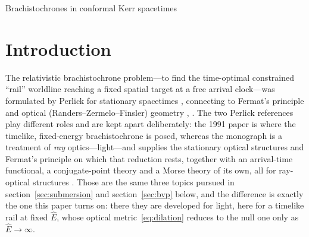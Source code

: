 \documentclass[12pt]{iopart}
\theoremstyle{plain}
\theoremstyle{definition}
\theoremstyle{remark}
\newcommand{\Ehat}{\hat E}
\begin{document}
\maketitle
%
         {Brachistochrones in conformal Kerr spacetimes}

\section{Introduction}
\label{sec:intro}
The relativistic brachistochrone problem---to find the time-optimal constrained ``rail''
worldline reaching a fixed spatial target at a free arrival clock---was formulated by
Perlick for stationary spacetimes \cite{Perlick1991}, connecting to Fermat's
principle and optical (Randers--Zermelo--Finsler) geometry
\cite[\S\S6.5--6.6,~7.3]{PerlickRayOptics},
\cite{Randers1941,GibbonsWerner2008,GibbonsRanders2009,BaoRoblesShen}. The two
Perlick references play different roles and are kept apart deliberately: the 1991
paper is where the timelike, fixed-energy brachistochrone is posed, whereas the
monograph is a treatment of \emph{ray} optics---light---and supplies the stationary
optical structures and Fermat's principle on which that reduction rests, together
with an arrival-time functional, a conjugate-point theory and a Morse theory of its
own, all for ray-optical structures \cite[\S\S7.3--7.5]{PerlickRayOptics}. Those
are the same three topics pursued in section~\ref{sec:submersion} and
section~\ref{sec:bvp} below, and the difference is exactly the one this paper turns
on: there they are developed for light, here for a timelike rail at fixed
$\Ehat$, whose optical metric~\eqref{eq:dilation} reduces to the null one only as
$\Ehat\to\infty$.
\end{document}
